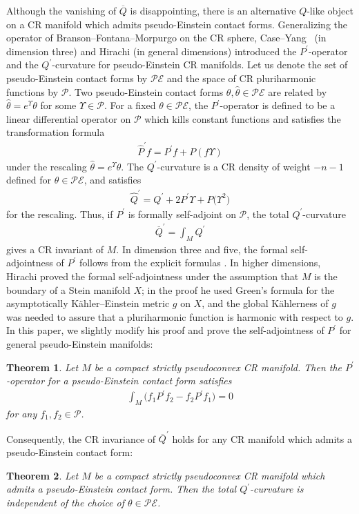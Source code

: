 \documentclass[10pt,a4paper]{amsart}
\numberwithin{equation}{section}
\newtheorem{Theorem}{Theorem}[section]
\begin{document}
Although the vanishing of $\overline{Q}$ is disappointing, there is an alternative $Q$-like object on a CR manifold which admits pseudo-Einstein contact forms. Generalizing the operator of Branson--Fontana--Morpurgo \cite{Branson/Fontana/Morpurgo} on the CR sphere, Case--Yang~\cite{Case/Yang} (in dimension three) and Hirachi \cite{Hirachi} (in general dimensions) introduced the $P^\prime$-operator and the $Q^\prime$-curvature for pseudo-Einstein CR manifolds. Let us denote the set of pseudo-Einstein contact forms by $\mathcal{PE}$ and the space of CR pluriharmonic functions by $\mathcal{P}$. Two pseudo-Einstein contact forms $\theta, \widehat\theta\in\mathcal{PE}$ are related by $\widehat\theta=e^\Upsilon \theta$ for some $\Upsilon\in\mathcal{P}$. For a f\/ixed $\theta\in\mathcal{PE}$, the $P^\prime$-operator is def\/ined to be a linear dif\/ferential operator on $\mathcal{P}$ which kills constant functions and satisf\/ies the transformation formula
\begin{gather*}
\widehat P^\prime f=P^\prime f+P(f\Upsilon)
\end{gather*}
under the rescaling $\widehat\theta=e^{\Upsilon}\theta$. The $Q^\prime$-curvature is a CR density of weight $-n-1$ def\/ined for $\theta\in\mathcal{PE}$, and satisf\/ies
\begin{gather*}
\widehat Q^\prime=Q^\prime+2P^\prime \Upsilon+P\big(\Upsilon^2\big)
\end{gather*}
for the rescaling. Thus, if $P^\prime$ is formally self-adjoint on $\mathcal{P}$, the total $Q^\prime$-curvature
\begin{gather*}
\overline{Q}^\prime=\int_M Q^\prime
\end{gather*}
gives a CR invariant of $M$. In dimension three and f\/ive, the formal self-adjointness of $P^\prime$ follows from the explicit formulas \cite{Case/Gover, Case/Yang}. In higher dimensions, Hirachi \cite[Theorem~4.5]{Hirachi} proved the formal self-adjointness under the assumption that $M$ is the boundary of a Stein manifold $X$; in the proof he used Green's formula for the asymptotically K\"ahler--Einstein metric $g$ on $X$, and the global K\"ahlerness of $g$ was needed to assure that a pluriharmonic function is harmonic with respect to $g$. In this paper, we slightly modify his proof and prove the self-adjointness of $P^\prime$ for general pseudo-Einstein manifolds:

\begin{Theorem}\label{self-adjoint} Let $M$ be a compact strictly pseudoconvex CR manifold. Then the $P^\prime$-operator for a pseudo-Einstein contact form satisfies
\begin{gather*}
\int_M \big(f_1P^\prime f_2-f_2 P^\prime f_1\big)=0
\end{gather*}
for any $f_1, f_2\in\mathcal{P}$.
\end{Theorem}
Consequently, the CR invariance of $\overline{Q}^\prime$ holds for any CR manifold which admits a pseudo-Einstein contact form:
\begin{Theorem}\label{CR-invariance}
Let $M$ be a compact strictly pseudoconvex CR manifold which admits a pseudo-Einstein contact form. Then the total $Q^\prime$-curvature is independent of the choice of $\theta\in\mathcal{PE}$.
\end{Theorem}
\end{document}
